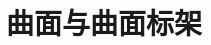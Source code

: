 \documentclass[oneside]{book}
\makeatletter
\theoremstyle{nonumberplain} %
\newcommand{\HUGE}{\@setfontsize\Huge{45}{54}}
\newcommand{\myTitle}{
\begin{titlepage}
	\begin{center}
		\vspace*{2 cm}
		{\HUGE\bfseries 现代张量分析讲义}
		
		\vspace{2 cm}
		{\LARGE 复旦大学 \quad 谢锡麟}
		
		\vspace{15 cm}
		{\LARGE\CJKfamily{楷体} \today}
	\end{center}
\end{titlepage}}
\makeatother
\begin{document}
%	
%	
%			
%		
%			
%	
%			
%		
%			
%		
%			
%		
%			
%	
		\chapter{曲面与曲面标架}
			
	
%	
	\listoffixmes
%		
\end{document}
